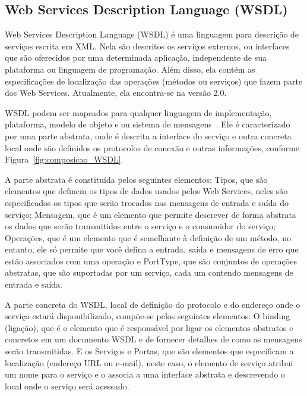 \subsection{Web Services Description Language (WSDL)}

Web Services Description Language (WSDL) é uma linguagem para descrição de serviços escrita em XML. Nela são descritos os serviços externos, ou interfaces que são oferecidos por uma determinada aplicação, independente de sua plataforma ou linguagem de programação. Além disso, ela contém as especificações de localização das operações (métodos ou serviços) que fazem parte dos Web Services. Atualmente, ela encontra-se na versão 2.0.

WSDL podem ser mapeados para qualquer linguagem de implementação, plataforma, modelo de objeto e ou sistema de mensagens~\cite{Bertino2010}. Ele é caracterizado por uma parte abstrata, onde é descrita a interface do serviço e outra concreta local onde são definidos os protocolos de conexão e outras informações, conforme Figura~\ref{fig:composicao_WSDL}.

A parte abstrata é constituída pelos seguintes elementos: Tipos, que são elementos que definem os tipos de dados usados pelos Web Services, neles são especificados os tipos que serão trocados nas mensagens de entrada e saída do serviço; Mensagem, que é um elemento que permite descrever de forma abstrata os dados que serão transmitidos entre o serviço e o consumidor do serviço; Operações, que é um elemento que é semelhante à definição de um método, no entanto, ele só permite que você defina a entrada, saída e mensagens de erro que estão associados com uma operação e PortType, que são conjuntos de operações abstratas, que são suportadas por um serviço, cada um contendo mensagens de entrada e saída.

A parte concreta do WSDL, local de definição do protocolo e do endereço onde o serviço estará disponibilizado, compõe-se pelos seguintes elementos: O binding (ligação), que é o elemento que é responsável por ligar os elementos abstratos e concretos em um documento WSDL e de fornecer detalhes de como as mensagens serão transmitidas. E os Serviços e Portas, que são elementos que especificam a localização (endereço URL ou e-mail), neste caso, o elemento de serviço atribui um nome para o serviço e o associa a uma interface abstrata e descrevendo o local onde o serviço será acessado.

